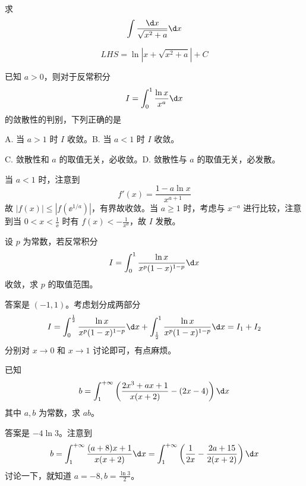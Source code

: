 \begin{problem}[000015]
求
\[ \int \frac{\d x}{\sqrt{x^2 + a}} \d x \]
\end{problem}
\begin{solution}
	\[ LHS =  \ln |x + \sqrt{x^2+a}| + C \]
\end{solution}


\begin{problem}[000027]
已知 $a > 0$，则对于反常积分
\[ I = \int_{0}^{1} \frac{\ln x}{x^a} \d x \]
的敛散性的判别，下列正确的是

A. 当 $a > 1$ 时 $I$ 收敛。B. 当 $a < 1$ 时 $I$ 收敛。

C. 敛散性和 $a$ 的取值无关，必收敛。D. 敛散性与 $a$ 的取值无关，必发散。
\end{problem}
\begin{solution}
	当 $a < 1$ 时，注意到
	\[ f'(x) = \frac{1 - a \ln x}{x^{a+1}} \]
	故 $|f(x)| \leqslant |f(\ee^{1/a})|$，有界故收敛。当 $a \geqslant 1$ 时，考虑与 $x^{-a}$ 进行比较，注意到当 $0 < x < \frac{1}{\ee}$ 时有 $f(x) < -\frac{1}{x^a}$，故 $I$ 发散。
\end{solution}

\begin{problem}[000028]
设 $p$ 为常数，若反常积分
\[ I = \int_{0}^{1} \frac{\ln x}{x^p(1-x)^{1-p}} \d x \]
收敛，求 $p$ 的取值范围。
\end{problem}
\begin{solution}
	答案是 $(-1,1)$。考虑划分成两部分
	\[ I = \int_{0}^{\frac{1}{2}} \frac{\ln x}{x^p(1-x)^{1-p}} \d x + \int_{\frac{1}{2}}^{1} \frac{\ln x}{x^p(1-x)^{1-p}} \d x = I_1 + I_2 \]
	分别对 $x \to 0$ 和 $x \to 1$ 讨论即可，有点麻烦。
\end{solution}

\begin{problem}[000029]
已知
\[ b = \int_{1}^{+\infty} \left(\frac{2x^3 + ax + 1}{x(x+2)} - (2x-4)\right) \d x \]
其中 $a,b$ 为常数，求 $ab$。
\end{problem}
\begin{solution}
	答案是 $-4 \ln 3$。注意到
	\[ b = \int_{1}^{+\infty} \frac{(a+8)x+1}{x(x+2)} \d x= \int_{1}^{+\infty} \left(\frac{1}{2x} - \frac{2a+15}{2(x+2)}\right) \d x \]
	讨论一下，就知道 $a = -8, b = \frac{\ln 3}{2} $。
\end{solution}

